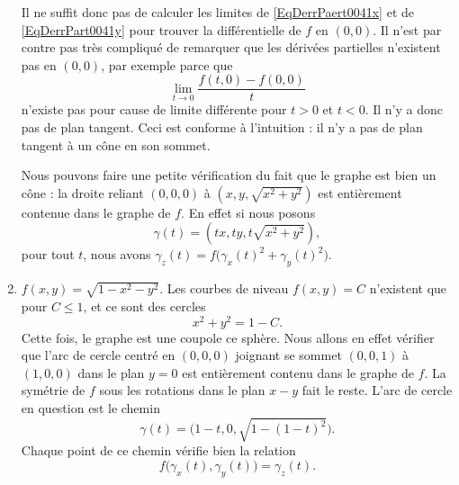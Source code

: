\begin{example}
\begin{enumerate}
		      Il ne suffit donc pas de calculer les limites de \ref{EqDerrPaert0041x} et de \ref{EqDerrPart0041y} pour trouver la différentielle de $f$ en $(0,0)$. Il n'est par contre pas très compliqué de remarquer que les dérivées partielles n'existent pas en $(0,0)$, par exemple parce que
		      \begin{equation}
			      \lim_{t\to 0}\frac{ f(t,0)-f(0,0) }{ t }
		      \end{equation}
		      n'existe pas pour cause de limite différente pour $t>0$ et $t<0$. Il n'y a donc pas de plan tangent.  Ceci est conforme à l'intuition : il n'y a pas de plan tangent à un cône en son sommet.

		      Nous pouvons faire une petite vérification du fait que le graphe est bien un cône : la droite reliant $(0,0,0)$ à $(x,y,\sqrt{x^2+y^2})$ est entièrement contenue dans le graphe de $f$. En effet si nous posons
		      \begin{equation}
			      \gamma(t)=(tx,ty,t\sqrt{x^2+y^2}),
		      \end{equation}
		      pour tout $t$, nous avons $\gamma_z(t)=f\big( \gamma_x(t)^2+\gamma_y(t)^2 \big)$.



		\item
		      $f(x,y)=\sqrt{1-x^2-y^2}$. Les courbes de niveau $f(x,y)=C$ n'existent que pour $C\leq 1$, et ce sont des cercles
		      \begin{equation}
			      x^2+y^2=1-C.
		      \end{equation}
		      Cette fois, le graphe est une coupole ce sphère. Nous allons en effet vérifier que l'arc de cercle centré en $(0,0,0)$ joignant se sommet $(0,0,1)$ à $(1,0,0)$ dans le plan $y=0$ est entièrement contenu dans le graphe de $f$. La symétrie de $f$ sous les rotations dans le plan $x-y$ fait le reste. L'arc de cercle en question est le chemin
		      \begin{equation}
			      \gamma(t)=\big( 1-t,0,\sqrt{1-(1-t)^2} \big).
		      \end{equation}
		      Chaque point de ce chemin vérifie bien la relation
		      \begin{equation}
			      f\big( \gamma_x(t),\gamma_y(t) \big)=\gamma_z(t).
		      \end{equation}


\end{enumerate}
\end{example}
